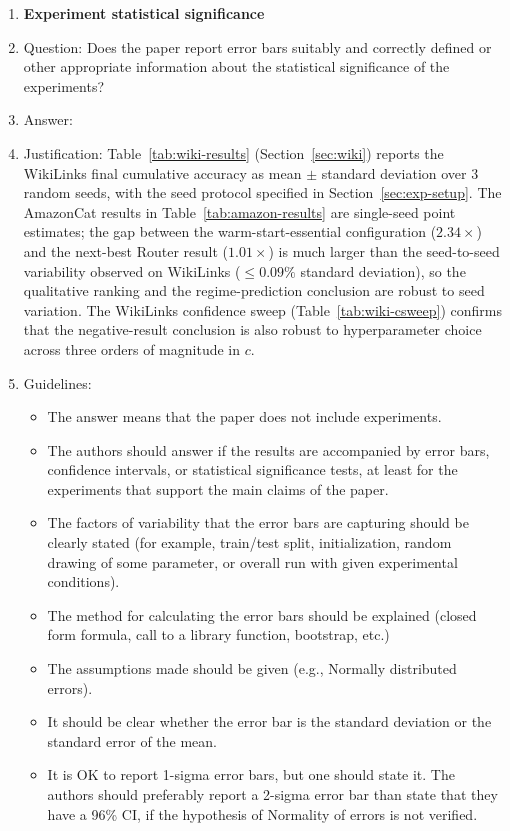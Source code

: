 \documentclass{article}
\theoremstyle{definition}
\theoremstyle{remark}
\theoremstyle{remark}
\begin{document}
\begin{enumerate}
\item {\bf Experiment statistical significance}
    \item[] Question: Does the paper report error bars suitably and correctly defined or other appropriate information about the statistical significance of the experiments?
    \item[] Answer: \answerYes{} %
    \item[] Justification: Table~\ref{tab:wiki-results} (Section~\ref{sec:wiki}) reports the WikiLinks final cumulative accuracy as mean $\pm$ standard deviation over 3 random seeds, with the seed protocol specified in Section~\ref{sec:exp-setup}. The AmazonCat results in Table~\ref{tab:amazon-results} are single-seed point estimates; the gap between the warm-start-essential configuration ($2.34\times$) and the next-best Router result ($1.01\times$) is much larger than the seed-to-seed variability observed on WikiLinks ($\le 0.09\%$ standard deviation), so the qualitative ranking and the regime-prediction conclusion are robust to seed variation. The WikiLinks confidence sweep (Table~\ref{tab:wiki-csweep}) confirms that the negative-result conclusion is also robust to hyperparameter choice across three orders of magnitude in $c$.
    \item[] Guidelines:
    \begin{itemize}
        \item The answer \answerNA{} means that the paper does not include experiments.
        \item The authors should answer \answerYes{} if the results are accompanied by error bars, confidence intervals, or statistical significance tests, at least for the experiments that support the main claims of the paper.
        \item The factors of variability that the error bars are capturing should be clearly stated (for example, train/test split, initialization, random drawing of some parameter, or overall run with given experimental conditions).
        \item The method for calculating the error bars should be explained (closed form formula, call to a library function, bootstrap, etc.)
        \item The assumptions made should be given (e.g., Normally distributed errors).
        \item It should be clear whether the error bar is the standard deviation or the standard error of the mean.
        \item It is OK to report 1-sigma error bars, but one should state it. The authors should preferably report a 2-sigma error bar than state that they have a 96\% CI, if the hypothesis of Normality of errors is not verified.

\end{itemize}
\end{enumerate}
\end{document}
